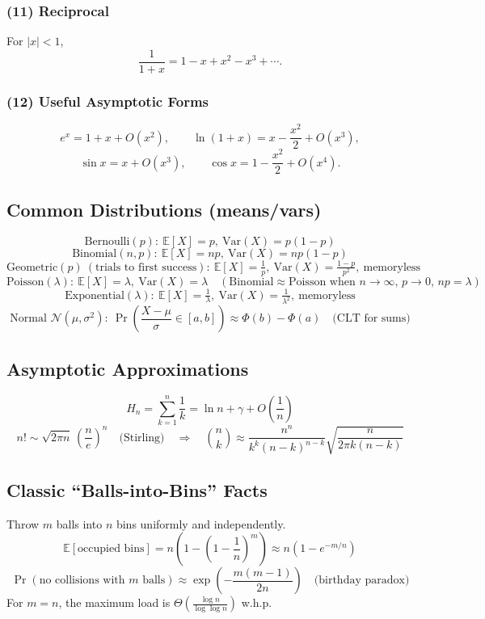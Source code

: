 \documentclass[10pt]{article}
\theoremstyle{definition}
\begin{document}
\subsubsection*{(11) Reciprocal}
For \(|x|<1\),
\[
\frac{1}{1+x}
    = 1 - x + x^2 - x^3 + \cdots.
\]

\subsubsection*{(12) Useful Asymptotic Forms}
\[
e^x = 1 + x + O(x^2), \qquad
\ln(1+x) = x - \frac{x^2}{2} + O(x^3),
\]
\[
\sin x = x + O(x^3), \qquad
\cos x = 1 - \frac{x^2}{2} + O(x^4).
\]

\subsection{Common Distributions (means/vars)}
\[
\text{Bernoulli}(p):\ \mathbb{E}[X]=p,\ \mathrm{Var}(X)=p(1-p)
\]
\[
\text{Binomial}(n,p):\ \mathbb{E}[X]=np,\ \mathrm{Var}(X)=np(1-p)
\]
\[
\text{Geometric}(p)\ (\text{trials to first success}):\ \mathbb{E}[X]=\tfrac{1}{p},\ \mathrm{Var}(X)=\tfrac{1-p}{p^2},\ \text{memoryless}
\]
\[
\text{Poisson}(\lambda):\ \mathbb{E}[X]=\lambda,\ \mathrm{Var}(X)=\lambda\quad(\text{Binomial}\approx\text{Poisson when }n\to\infty,\,p\to0,\,np=\lambda)
\]
\[
\text{Exponential}(\lambda):\ \mathbb{E}[X]=\tfrac{1}{\lambda},\ \mathrm{Var}(X)=\tfrac{1}{\lambda^2},\ \text{memoryless}
\]
\[
\text{Normal } \mathcal{N}(\mu,\sigma^2):\ \Pr\left(\frac{X-\mu}{\sigma}\in[a,b]\right)\approx \Phi(b)-\Phi(a)\quad\text{(CLT for sums)}
\]

\subsection{Asymptotic Approximations}
\[
H_n=\sum_{k=1}^n \frac{1}{k}=\ln n+\gamma+O\!\left(\frac{1}{n}\right)
\]
\[
n!\sim \sqrt{2\pi n}\,\left(\frac{n}{e}\right)^n\quad\text{(Stirling)}\quad\Rightarrow\quad \binom{n}{k}\approx \frac{n^n}{k^k(n-k)^{n-k}}\sqrt{\frac{n}{2\pi k(n-k)}}
\]

\subsection{Classic “Balls-into-Bins” Facts}
Throw $m$ balls into $n$ bins uniformly and independently.
\[
\mathbb{E}[\text{occupied bins}] = n\left(1-\left(1-\frac{1}{n}\right)^{\!m}\right)\approx n\left(1-e^{-m/n}\right)
\]
\[
\Pr(\text{no collisions with }m\text{ balls})\approx \exp\!\left(-\frac{m(m-1)}{2n}\right)\quad\text{(birthday paradox)}
\]
For $m=n$, the maximum load is $\Theta\!\left(\frac{\log n}{\log\log n}\right)$ w.h.p.
\end{document}

